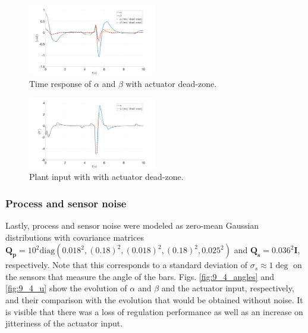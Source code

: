 \documentclass[letterpaper, 10 pt, conference]{ieeeconf}
\begin{document}
\begin{figure}[h]
    \centering
    \includegraphics[width = 0.5\textwidth]{figures/9_3_angles.png}
    \caption{Time response of $\alpha$ and $\beta$ with actuator dead-zone.}
    \label{fig:9_3_angles}
\end{figure}
\begin{figure}[h]
    \centering
    \includegraphics[width = 0.5\textwidth]{figures/9_3_u.png}
    \caption{Plant input with with actuator dead-zone.}
    \label{fig:9_3_u}
\end{figure}

\subsubsection{Process and sensor noise} Lastly, process and sensor noise were modeled as zero-mean Gaussian distributions with covariance matrices \phantom{mmmmmmmmmmmmmmmmmmmmm} $\mathbf{Q_p}\!\!=\!\!10^2\mathrm{diag}(0.018^2,(0.18)^2,(0.018)^2,(0.18)^2,0.025^2)$ and $\mathbf{Q_s} = 0.036^2\mathbf{I}$, respectively. Note that this corresponds to a standard deviation of $\sigma_s \approx 1 \deg$ on the sensors that measure the angle of the bars. Figs. \ref{fig:9_4_angles} and \ref{fig:9_4_u} show the evolution of $\alpha$ and $\beta$ and the actuator input, respectively, and their comparison with the evolution that would be obtained without noise. It is visible that there was a loss of regulation performance as well as an increase on jitteriness of the actuator input.
\end{document}
